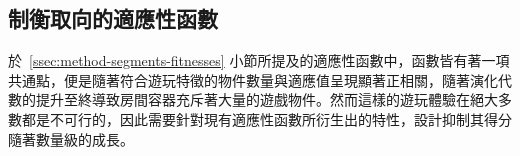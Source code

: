 









\subsection{制衡取向的適應性函數}
\label{ssec:method-segments-balancefitness}

於~\ref{ssec:method-segments-fitnesses} 小節所提及的適應性函數中，函數皆有著一項共通點，便是隨著符合遊玩特徵的物件數量與適應值呈現顯著正相關，隨著演化代數的提升至終導致房間容器充斥著大量的遊戲物件。然而這樣的遊玩體驗在絕大多數都是不可行的，因此需要針對現有適應性函數所衍生出的特性，設計抑制其得分隨著數量級的成長。

